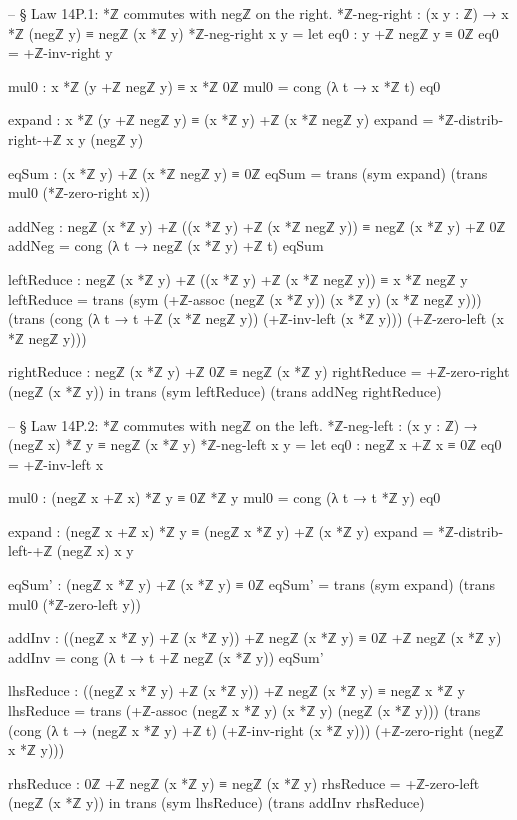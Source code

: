 \documentclass[11pt,a4paper]{book}
\begin{document}
\begin{code}
-- § Law 14P.1: *ℤ commutes with negℤ on the right.
*ℤ-neg-right : (x y : ℤ) → x *ℤ (negℤ y) ≡ negℤ (x *ℤ y)
*ℤ-neg-right x y =
  let
    eq0 : y +ℤ negℤ y ≡ 0ℤ
    eq0 = +ℤ-inv-right y

    mul0 : x *ℤ (y +ℤ negℤ y) ≡ x *ℤ 0ℤ
    mul0 = cong (λ t → x *ℤ t) eq0

    expand : x *ℤ (y +ℤ negℤ y) ≡ (x *ℤ y) +ℤ (x *ℤ negℤ y)
    expand = *ℤ-distrib-right-+ℤ x y (negℤ y)

    eqSum : (x *ℤ y) +ℤ (x *ℤ negℤ y) ≡ 0ℤ
    eqSum = trans (sym expand) (trans mul0 (*ℤ-zero-right x))

    addNeg : negℤ (x *ℤ y) +ℤ ((x *ℤ y) +ℤ (x *ℤ negℤ y)) ≡ negℤ (x *ℤ y) +ℤ 0ℤ
    addNeg = cong (λ t → negℤ (x *ℤ y) +ℤ t) eqSum

    leftReduce : negℤ (x *ℤ y) +ℤ ((x *ℤ y) +ℤ (x *ℤ negℤ y)) ≡ x *ℤ negℤ y
    leftReduce =
      trans
        (sym (+ℤ-assoc (negℤ (x *ℤ y)) (x *ℤ y) (x *ℤ negℤ y)))
        (trans
          (cong (λ t → t +ℤ (x *ℤ negℤ y)) (+ℤ-inv-left (x *ℤ y)))
          (+ℤ-zero-left (x *ℤ negℤ y)))

    rightReduce : negℤ (x *ℤ y) +ℤ 0ℤ ≡ negℤ (x *ℤ y)
    rightReduce = +ℤ-zero-right (negℤ (x *ℤ y))
  in
  trans
    (sym leftReduce)
    (trans addNeg rightReduce)

-- § Law 14P.2: *ℤ commutes with negℤ on the left.
*ℤ-neg-left : (x y : ℤ) → (negℤ x) *ℤ y ≡ negℤ (x *ℤ y)
*ℤ-neg-left x y =
  let
    eq0 : negℤ x +ℤ x ≡ 0ℤ
    eq0 = +ℤ-inv-left x

    mul0 : (negℤ x +ℤ x) *ℤ y ≡ 0ℤ *ℤ y
    mul0 = cong (λ t → t *ℤ y) eq0

    expand : (negℤ x +ℤ x) *ℤ y ≡ (negℤ x *ℤ y) +ℤ (x *ℤ y)
    expand = *ℤ-distrib-left-+ℤ (negℤ x) x y

    eqSum' : (negℤ x *ℤ y) +ℤ (x *ℤ y) ≡ 0ℤ
    eqSum' = trans (sym expand) (trans mul0 (*ℤ-zero-left y))

    addInv : ((negℤ x *ℤ y) +ℤ (x *ℤ y)) +ℤ negℤ (x *ℤ y) ≡ 0ℤ +ℤ negℤ (x *ℤ y)
    addInv = cong (λ t → t +ℤ negℤ (x *ℤ y)) eqSum'

    lhsReduce : ((negℤ x *ℤ y) +ℤ (x *ℤ y)) +ℤ negℤ (x *ℤ y) ≡ negℤ x *ℤ y
    lhsReduce =
      trans
        (+ℤ-assoc (negℤ x *ℤ y) (x *ℤ y) (negℤ (x *ℤ y)))
        (trans
          (cong (λ t → (negℤ x *ℤ y) +ℤ t) (+ℤ-inv-right (x *ℤ y)))
          (+ℤ-zero-right (negℤ x *ℤ y)))

    rhsReduce : 0ℤ +ℤ negℤ (x *ℤ y) ≡ negℤ (x *ℤ y)
    rhsReduce = +ℤ-zero-left (negℤ (x *ℤ y))
  in
  trans
    (sym lhsReduce)
    (trans addInv rhsReduce)
\end{code}
\end{document}

